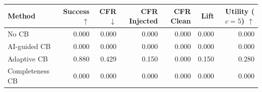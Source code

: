 \begin{tabular}{lrrrrrr}
\toprule
Method & Success $\uparrow$ & CFR $\downarrow$ & CFR Injected & CFR Clean & Lift & Utility ($c=5$) $\uparrow$ \\
\midrule
No CB & 0.000 & 0.000 & 0.000 & 0.000 & 0.000 & 0.000 \\
AI-guided CB & 0.000 & 0.000 & 0.000 & 0.000 & 0.000 & 0.000 \\
Adaptive CB & 0.880 & 0.429 & 0.150 & 0.000 & 0.150 & 0.280 \\
Completeness CB & 0.000 & 0.000 & 0.000 & 0.000 & 0.000 & 0.000 \\
\bottomrule
\end{tabular}
